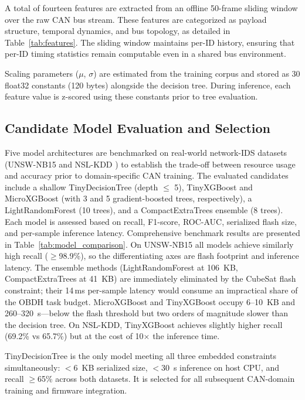 A total of fourteen features are extracted from an offline 50-frame sliding window over the raw CAN bus stream. These features are categorized as payload structure, temporal dynamics, and bus topology, as detailed in Table~\ref{tab:features}. The sliding window maintains per-ID history, ensuring that per-ID timing statistics remain computable even in a shared bus environment.

Scaling parameters ($\mu$, $\sigma$) are estimated from the training corpus and stored as 30 float32 constants (120 bytes) alongside the decision tree. During inference, each feature value is z-scored using these constants prior to tree evaluation.

\subsection{Candidate Model Evaluation and Selection}
\label{sec:model_selection}

Five model architectures are benchmarked on real-world network-IDS datasets (UNSW-NB15 and NSL-KDD \cite{UNSW2015, NSLKDD2009}) to establish the trade-off between resource usage and accuracy prior to domain-specific CAN training. The evaluated candidates include a shallow TinyDecisionTree (depth $\leq$ 5), TinyXGBoost and MicroXGBoost (with 3 and 5 gradient-boosted trees, respectively), a LightRandomForest (10 trees), and a CompactExtraTrees ensemble (8 trees). Each model is assessed based on recall, F1-score, ROC-AUC, serialized flash size, and per-sample inference latency. Comprehensive benchmark results are presented in Table~\ref{tab:model_comparison}. On UNSW-NB15 all models achieve similarly high recall ($\geq$98.9\%), so the differentiating axes are flash footprint and inference latency. The ensemble methods (LightRandomForest at 106~KB, CompactExtraTrees at 41~KB) are immediately eliminated by the CubeSat flash constraint; their 14\,ms per-sample latency would consume an impractical share of the OBDH task budget. MicroXGBoost and TinyXGBoost occupy 6--10~KB and 260--320~\textmu s—below the flash threshold but two orders of magnitude slower than the decision tree. On NSL-KDD, TinyXGBoost achieves slightly higher recall (69.2\% vs 65.7\%) but at the cost of 10$\times$ the inference time.

TinyDecisionTree is the only model meeting all three embedded constraints simultaneously: $<$6~KB serialized size, $<$30~\textmu s inference on host CPU, and recall $\geq$65\% across both datasets. It is selected for all subsequent CAN-domain training and firmware integration.

